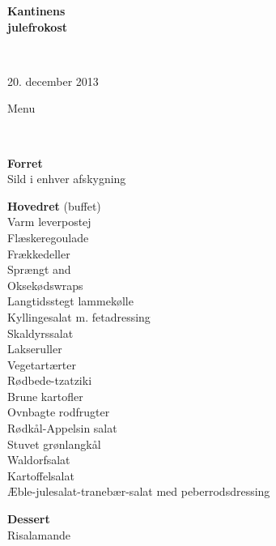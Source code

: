 \begin{center}
\begin{HUGE}
\textbf{Kantinens \\[3mm] julefrokost}
\end{HUGE}
\\[.6cm]
\begin{Large}
20. december 2013
\end{Large}
\end{center}
\vspace*{.4cm}
\begin{flushleft}
\begin{huge}
Menu
\end{huge}
\\[.1cm]
\newcommand{\course}[1]{\vspace*{4mm} \textbf{#1} \vspace{1mm}}
{\small
\course{Forret}
\\ Sild i enhver afskygning

\course{Hovedret} (buffet)
\\ Varm leverpostej
\\ Flæskeregoulade
\\ Frækkedeller
\\ Sprængt and
\\ Oksekødswraps
\\ Langtidsstegt lammekølle
\\ Kyllingesalat m. fetadressing
\\[2mm] Skaldyrssalat
\\ Lakseruller
\\[2mm] Vegetartærter
\\ Rødbede-tzatziki
\\ Brune kartofler
\\ Ovnbagte rodfrugter
\\ Rødkål-Appelsin salat
\\ Stuvet grønlangkål
\\ Waldorfsalat
\\ Kartoffelsalat
\\ Æble-julesalat-tranebær-salat med peberrodsdressing

\course{Dessert}
\\ Risalamande
}
\end{flushleft}

